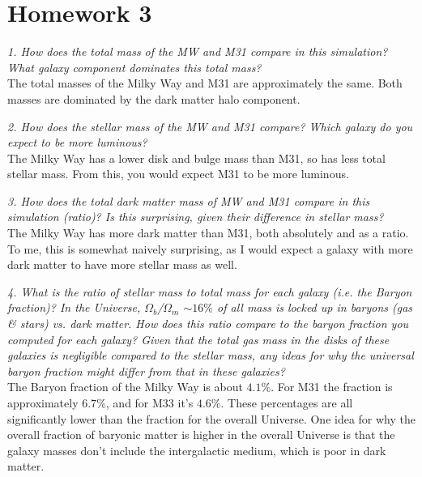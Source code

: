\documentclass[12pt]{article}
\begin{document}
\thispagestyle{empty}
\section*{Homework 3}

\noindent \textit{1. How does the total mass of the MW and M31 compare in this simulation? What galaxy component dominates this total mass?}\\

\noindent The total masses of the Milky Way and M31 are approximately the same. Both masses are dominated by the dark matter halo component.\\
\newline

\noindent \textit{2. How does the stellar mass of the MW and M31 compare? Which galaxy do you expect to be more luminous?}\\

\noindent The Milky Way has a lower disk and bulge mass than M31, so has less total stellar mass. From this, you would expect M31 to be more luminous.\\
\newline

\noindent \textit{3. How does the total dark matter mass of MW and M31 compare in this simulation (ratio)? Is this surprising, given their difference in stellar mass?}\\

\noindent The Milky Way has more dark matter than M31, both absolutely and as a ratio. To me, this is somewhat naively surprising, as I would expect a galaxy with more dark matter to have more stellar mass as well.\\
\newline

\noindent \textit{4. What is the ratio of stellar mass to total mass for each galaxy (i.e. the Baryon fraction)? In the Universe, ${\Omega}_b$/${\Omega}_m$ $\sim16\%$ of all mass is locked up in baryons (gas \& stars) vs. dark matter. How does this ratio compare to the baryon fraction you computed for each galaxy? Given that the total gas mass in the disks of these galaxies is negligible compared to the stellar mass, any ideas for why the universal baryon fraction might differ from that in these galaxies?}\\

\noindent The Baryon fraction of the Milky Way is about $4.1\%$. For M31 the fraction is approximately $6.7\%$, and for M33 it's $4.6\%$. These percentages are all significantly lower than the fraction for the overall Universe. One idea for why the overall fraction of baryonic matter is higher in the overall Universe is that the galaxy masses don't include the intergalactic medium, which is poor in dark matter.\\
\end{document}
